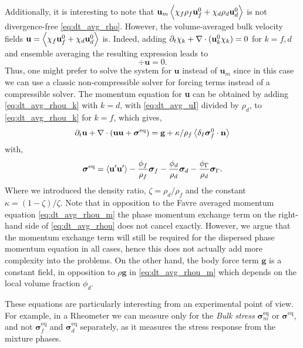 Additionally, it is interesting to note that $\textbf{u}_m \left<\chi_f\rho_f \textbf{u}_f^0 + \chi_d \rho_d \textbf{u}_d^0\right> $ is not divergence-free \eqref{eq:dt_avg_rho}. 
However,  the volume-averaged bulk velocity fields $\textbf{u} = \left<\chi_f \textbf{u}_f^0 + \chi_d \textbf{u}_d^0\right> $ is. 
Indeed, adding $\partial_t \chi_k + \mathbf{\nabla}\cdot (\textbf{u}_k^0\chi_k) =0$ for $k=f,d$ and ensemble averaging the resulting expression leads to 
\begin{equation}
    \div\textbf{u}=0.
\end{equation}
Thus, one might prefer to solve the system for $\textbf{u}$ instead of $\textbf{u}_m$ since in this case we can use a classic non-compressible solver for forcing terms instead of a compressible solver. 
The momentum equation for \textbf{u} can be obtained by adding \ref{eq:dt_avg_rhou_k} with $k=d$, with \ref{eq:dt_avg_uI} divided by $\rho_d$, to \ref{eq:dt_avg_rhou_k} for $k=f$, which gives, 
\begin{equation}
    \pddt \textbf{u}  
    + \div (
        \textbf{u}\textbf{u}
        + \bm{\sigma}^\text{eq}
    )
    = 
    \textbf{g} 
    + \kappa/\rho_f  \avg{\delta_I \bm{\sigma}_f^0 \cdot \textbf{n}} 
    \label{eq:dt_avg_rhou}
\end{equation}
with, 
\begin{equation}
    \bm\sigma^\text{eq} = 
    \left< \textbf{u}'\textbf{u}'\right>
    - \frac{\phi_f}{\rho_f}\bm\sigma_f
    - \frac{\phi_d}{\rho_d}\bm\sigma_d
    - \frac{\phi_\Gamma}{\rho_d} \bm\sigma_\Gamma. 
\end{equation}
Where we introduced the density ratio, $\zeta = \rho_d  / \rho_f$ and the constant $\kappa = (1-\zeta)/\zeta$. 
Note that in opposition to the Favre averaged momentum equation \eqref{eq:dt_avg_rhou_m} the phase momentum exchange term on the right-hand side of \ref{eq:dt_avg_rhou} does not cancel exactly. 
However, we argue that the momentum exchange term will still be required for the dispersed phase momentum equation in all cases, hence this does not actually add more complexity into the problems.
On the other hand, the body force term $\textbf{g}$ is a constant field, in opposition to $\rho \textbf{g}$ in \eqref{eq:dt_avg_rhou_m} which depends on the local volume fraction $\phi_d$. 


These equations are particularly interesting from an experimental point of view. 
For example, in a Rheometer we can measure only for the \textit{Bulk stress} $\bm\sigma^\text{eq}_m$ or $\bm\sigma^\text{eq}$, and not $\bm\sigma^\text{eq}_f$ and $\bm\sigma^\text{eq}_d$ separately, as it measures the stress response from the mixture phases. 

